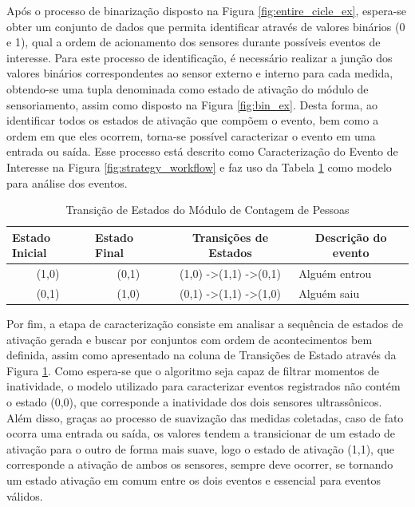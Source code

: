 Após o processo de binarização disposto na Figura \ref{fig:entire_cicle_ex}, espera-se obter um conjunto de dados que permita identificar através de valores binários (0 e 1), qual a ordem de acionamento dos sensores durante possíveis eventos de interesse. Para este processo de identificação, é necessário realizar a junção dos valores binários correspondentes ao sensor externo e interno para cada medida, obtendo-se uma tupla denominada como estado de ativação do módulo de sensoriamento, assim como disposto na Figura \ref{fig:bin_ex}. Desta forma, ao identificar todos os estados de ativação que compõem o evento, bem como a ordem em que eles ocorrem, torna-se possível caracterizar o evento em uma entrada ou saída. Esse processo está descrito como Caracterização do Evento de Interesse na Figura \ref{fig:strategy_workflow} e faz uso da Tabela \ref{tab:state_machine} como modelo para análise dos eventos.

\begin{table}[H]
	\centering
	\caption{Transição de Estados do Módulo de Contagem de Pessoas}\label{tab:state_machine}
	\begin{tabular}{|c|c|c|l|}
		\hline
		\multicolumn{1}{|l|}{\textbf{Estado Inicial}} & \multicolumn{1}{l|}{\textbf{Estado Final}} & \textbf{Transições de Estados}                & \multicolumn{1}{c|}{\textbf{Descrição do evento}} \\ \hline
		(1,0)                                         & (0,1)                                      & (1,0) -\textgreater (1,1) -\textgreater (0,1) & Alguém entrou                                     \\ \hline
		(0,1)                                         & (1,0)                                      & (0,1) -\textgreater (1,1) -\textgreater (1,0) & Alguém saiu                                       \\ \hline
	\end{tabular}
\end{table}

Por fim, a etapa de caracterização consiste em analisar a sequência de estados de ativação gerada e buscar por conjuntos com ordem de acontecimentos bem definida, assim como apresentado na coluna de Transições de Estado através da Figura \ref{tab:state_machine}. Como espera-se que o algoritmo seja capaz de filtrar momentos de inatividade, o modelo utilizado para caracterizar eventos registrados não contém o estado (0,0), que corresponde a inatividade dos dois sensores ultrassônicos. Além disso, graças ao processo de suavização das medidas coletadas, caso de fato ocorra uma entrada ou saída, os valores tendem a transicionar de um estado de ativação para o outro de forma mais suave, logo o estado de ativação (1,1), que corresponde a ativação de ambos os sensores, sempre deve ocorrer, se tornando um estado ativação em comum entre os dois eventos e essencial para eventos válidos.


